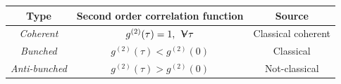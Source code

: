 \begin{table}[H]
\centering
\begin{tabular}{@{}ccc@{}}
\toprule
\textbf{Type}         & \textbf{Second order correlation function}                    & \textbf{Source}    \\ \midrule
\textit{Coherent}     & $g^{(2)}(\tau) = 1, \hspace{1ex}\forall \, \tau$ & Classical coherent \\[0.75ex]
\textit{Bunched}      & $g^{(2)}(\tau) < g^{(2)}(0)$                                  & Classical          \\[0.75ex]
\textit{Anti-bunched} & $g^{(2)}(\tau) > g^{(2)}(0)$                                  & Not-classical      \\ \bottomrule
\end{tabular}
\end{table}